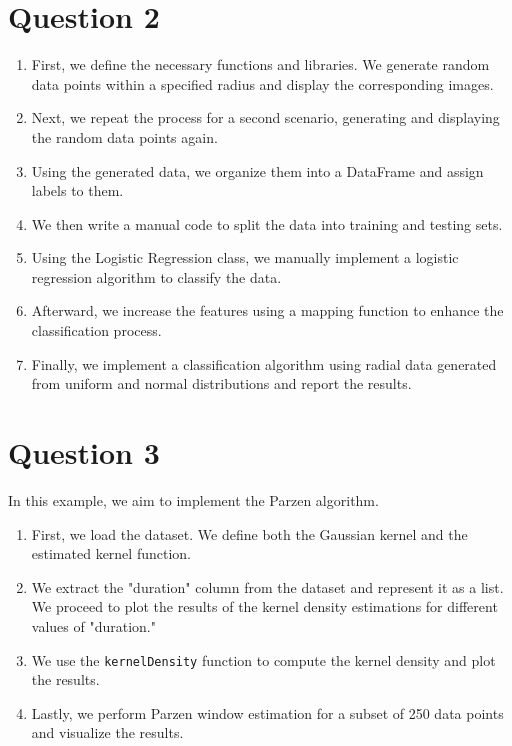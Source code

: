 \documentclass[DIV=calc, paper=a4, fontsize=11pt, twocolumn]{scrartcl}	 %
\begin{document}
\section*{\small{Question 2}}

\begin{enumerate}
    \item First, we define the necessary functions and libraries. We generate random data points within a specified radius and display the corresponding images.
    \item Next, we repeat the process for a second scenario, generating and displaying the random data points again.
    \item Using the generated data, we organize them into a DataFrame and assign labels to them.
    \item We then write a manual code to split the data into training and testing sets.
    \item Using the Logistic Regression class, we manually implement a logistic regression algorithm to classify the data.
    \item Afterward, we increase the features using a mapping function to enhance the classification process.
    \item Finally, we implement a classification algorithm using radial data generated from uniform and normal distributions and report the results.
\end{enumerate}

\section*{\small{Question 3}}

In this example, we aim to implement the Parzen algorithm.

\begin{enumerate}
    \item First, we load the dataset. We define both the Gaussian kernel and the estimated kernel function.
    \item We extract the "duration" column from the dataset and represent it as a list. We proceed to plot the results of the kernel density estimations for different values of "duration."
    \item We use the \texttt{kernelDensity} function to compute the kernel density and plot the results.
    \item Lastly, we perform Parzen window estimation for a subset of 250 data points and visualize the results.
\end{enumerate}
\end{document}
